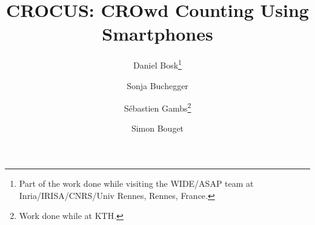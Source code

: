 \documentclass{llncs}
\begin{document}
\title{%
  CROCUS: CROwd Counting Using Smartphones 
}

\author{%
  Daniel Bosk\thanks{%
    Part of the work done while visiting the WIDE/ASAP team at 
    Inria/IRISA/CNRS/Univ Rennes, Rennes, France.
  } \and
  Sonja Buchegger \and
  Sébastien Gambs\thanks{%
    Work done while at KTH.
  } \and
  Simon Bouget%
}


\end{document}
